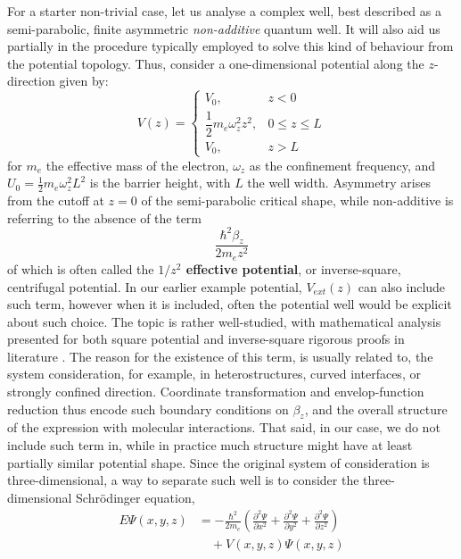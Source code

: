 \documentclass[%
 reprint,
 amsmath,amssymb,
 aps,
]{revtex4-2}
\begin{document}
For a starter non-trivial case, let us analyse a complex well, best described as a semi-parabolic, finite asymmetric \textit{non-additive} quantum well. It will also aid us partially in the procedure typically employed to solve this kind of behaviour from the potential topology. Thus, consider a one-dimensional potential along the $z$-direction given by:
\begin{equation}
    V(z) = 
\begin{cases}
V_0, & z < 0 \\
\dfrac{1}{2} m_e \omega_z^2 z^2, & 0 \le z \le L \\
V_0, & z > L
\end{cases}
\end{equation}
for $m_{e}$ the effective mass of the electron, $\omega_{z}$ as the confinement frequency, and $U_0 = \frac{1}{2} m_e \omega_z^2 L^2$ is the barrier height, with $L$ the well width. Asymmetry arises from the cutoff at $z=0$ of the semi-parabolic critical shape, while non-additive is referring to the absence of the term
\begin{equation}
    \dfrac{\hbar^{2}\beta_{z}}{2m_{e}z^{2}}
\end{equation}
of which is often called the \textbf{$1/z^2$ effective potential}, or inverse-square, centrifugal potential. In our earlier example potential, $V_{ext}(z)$ can also include such term, however when it is included, often the potential well would be explicit about such choice. The topic is rather well-studied, with mathematical analysis presented for both square potential \cite{Ishida_2025} and inverse-square rigorous proofs in literature \cite{chorfi2024uniquenessschrodingerequationinverse}. The reason for the existence of this term, is usually related to, the system consideration, for example, in heterostructures, curved interfaces, or strongly confined direction. Coordinate transformation and envelop-function reduction thus encode such boundary conditions on $\beta_{z}$, and the overall structure of the expression with molecular interactions. That said, in our case, we do not include such term in, while in practice much structure might have at least partially similar potential shape. 
Since the original system of consideration is three-dimensional, a way to separate such well is to consider the three-dimensional Schrödinger equation,
\begin{equation}
    \begin{split}
        E \Psi(x, y, z) &= -\frac{\hbar^2}{2m_e} \left( \frac{\partial^2 \Psi}{\partial x^2} + \frac{\partial^2 \Psi}{\partial y^2} 
         + \frac{\partial^2 \Psi}{\partial z^2} \right) \\
         &\quad + V(x, y, z) \Psi(x, y, z) 
    \end{split}
\end{equation}
\end{document}
